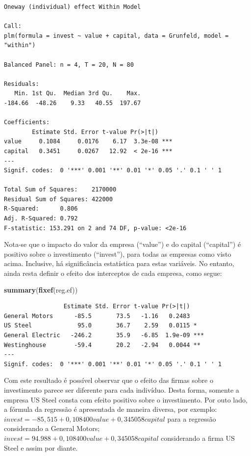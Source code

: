 \documentclass[12pt,brazil,oneside]{book}
\newenvironment{Shaded}{\begin{snugshade}}{\end{snugshade}}
\newcommand{\KeywordTok}[1]{\textcolor[rgb]{0.13,0.29,0.53}{\textbf{#1}}}
\newcommand{\NormalTok}[1]{#1}
\begin{document}
\begin{verbatim}
Oneway (individual) effect Within Model

Call:
plm(formula = invest ~ value + capital, data = Grunfeld, model = "within")

Balanced Panel: n = 4, T = 20, N = 80

Residuals:
   Min. 1st Qu.  Median 3rd Qu.    Max. 
-184.66  -48.26    9.33   40.55  197.67 

Coefficients:
        Estimate Std. Error t-value Pr(>|t|)    
value     0.1084     0.0176    6.17  3.3e-08 ***
capital   0.3451     0.0267   12.92  < 2e-16 ***
---
Signif. codes:  0 '***' 0.001 '**' 0.01 '*' 0.05 '.' 0.1 ' ' 1

Total Sum of Squares:    2170000
Residual Sum of Squares: 422000
R-Squared:      0.806
Adj. R-Squared: 0.792
F-statistic: 153.291 on 2 and 74 DF, p-value: <2e-16
\end{verbatim}

Nota-se que o impacto do valor da empresa (``value'') e do capital (``capital'') é positivo sobre o investimento (``invest''), para todas as empresas como visto acima. Inclusive, há significância estatística
para estas variáveis. No entanto, ainda resta definir o efeito dos interceptos de cada empresa, como segue:

\begin{Shaded}
\begin{Highlighting}[]
\KeywordTok{summary}\NormalTok{(}\KeywordTok{fixef}\NormalTok{(reg.ef))}
\end{Highlighting}
\end{Shaded}

\begin{verbatim}
                 Estimate Std. Error t-value Pr(>|t|)    
General Motors      -85.5       73.5   -1.16   0.2483    
US Steel             95.0       36.7    2.59   0.0115 *  
General Electric   -246.2       35.9   -6.85  1.9e-09 ***
Westinghouse        -59.4       20.2   -2.94   0.0044 ** 
---
Signif. codes:  0 '***' 0.001 '**' 0.01 '*' 0.05 '.' 0.1 ' ' 1
\end{verbatim}

Com este resultado é possível observar que o efeito das firmas sobre o investimento parece ser diferente para cada indivíduo. Desta forma, somente a empresa US Steel consta com efeito positivo sobre o investimento. Por outo lado, a fórmula da regressão é apresentada de maneira diversa, por exemplo: \(invest = -85,515 + 0,108400value + 0,345058capital\) para a regressão considerando a General Motors; \(invest = 94.988 + 0,108400value + 0,345058capital\) considerando a firma US Steel e assim por diante.
\end{document}
